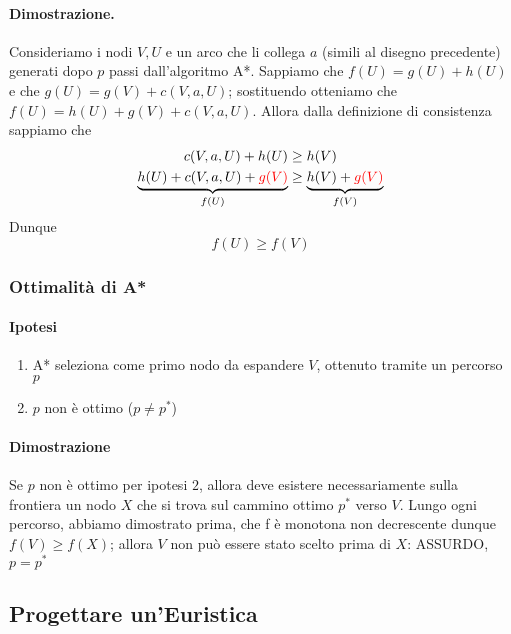 \paragraph{Dimostrazione. }
Consideriamo i nodi $V,U$ e un arco che li collega $a$ (simili al disegno precedente) generati dopo $p$ passi dall'algoritmo A*.
Sappiamo che $f(U) = g(U) + h(U)$ e che $g(U) = g(V) + c(V,a,U)$; sostituendo otteniamo che $f(U) = h(U) + g(V) + c(V,a,U)$. Allora dalla definizione di consistenza sappiamo che
\begin{align*}
    c(V,a,U) + h(U) &\geq h(V)\\
    \underbrace{h(U) + c(V,a,U) + \textcolor{red}{g(V)}}_{f(U)} &\geq \underbrace{h(V) + \textcolor{red}{g(V)}}_{f(V)} \\
\end{align*}
Dunque
\begin{equation*}
    f(U) \geq f(V)
\end{equation*}

\subsubsection{Ottimalità di A*}
\paragraph{Ipotesi}
\begin{enumerate}
    \item A* seleziona come primo nodo da espandere $V$, ottenuto tramite un percorso $p$
    \item $p$ non è ottimo ($p \neq p^*$)
\end{enumerate}

\paragraph{Dimostrazione}
Se $p$ non è ottimo per ipotesi $2$, allora deve esistere necessariamente sulla frontiera un nodo $X$ che si trova sul cammino ottimo
$p^*$ verso $V$. Lungo ogni percorso, abbiamo dimostrato prima, che f è monotona non decrescente dunque $f(V) \geq f(X)$; allora $V$ non può
essere stato scelto prima di $X$: ASSURDO, $p = p^{*}$

\subsection{Progettare un'Euristica}
\begin{center}
\end{center}

